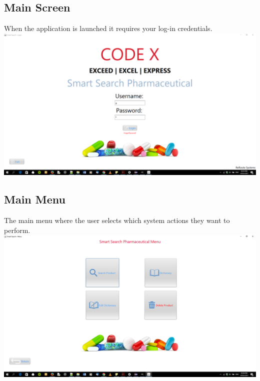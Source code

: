 \documentclass[a4paper,10pt]{article}
\begin{document}
	\subsection{Main Screen}
	When the application is launched it requires your log-in credentials.\\
	{\centering\includegraphics[width=15cm, scale=0.5]{2.png}}

	\subsection{Main Menu}
	The main menu where the user selects which system actions they want to perform. \\
	{\centering\includegraphics[width=15cm, scale=0.5]{3.png}} \\ \\
\end{document}
